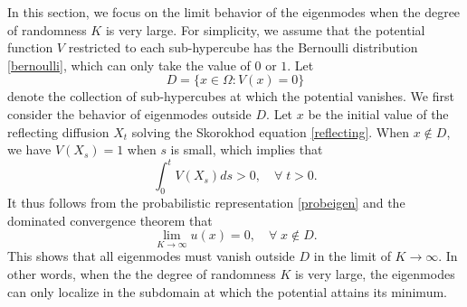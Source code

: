 \documentclass[a4paper,11pt]{article}
\begin{document}
In this section, we focus on the limit behavior of the eigenmodes when the degree of randomness $K$ is very large. For simplicity, we assume that the potential function $V$ restricted to each sub-hypercube has the Bernoulli distribution \eqref{bernoulli}, which can only take the value of $0$ or $1$. Let
\begin{equation*}
D = \{x \in \Omega: V(x) = 0\}
\end{equation*}
denote the collection of sub-hypercubes at which the potential vanishes. We first consider the behavior of eigenmodes outside $D$. Let $x$ be the initial value of the reflecting diffusion $X_t$ solving the Skorokhod equation \eqref{reflecting}. When $x \notin D$, we have $V(X_s) = 1$ when $s$ is small, which implies that
\begin{equation*}
\int_{0}^{t} V(X_s) ds > 0, \quad \forall \; t > 0.
\end{equation*}
It thus follows from the probabilistic representation \eqref{probeigen} and the dominated convergence theorem that
\begin{equation}\label{largeK}
\lim_{K \rightarrow \infty} u(x) = 0, \quad \forall \; x \notin D.
\end{equation}
This shows that all eigenmodes must vanish outside $D$ in the limit of $K \rightarrow \infty$. In other words, when the the degree of randomness $K$ is very large, the eigenmodes can only localize in the subdomain at which the potential attains its minimum.
\end{document}
